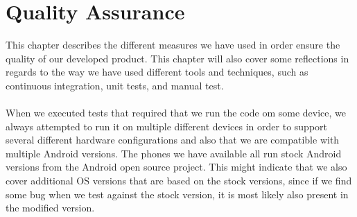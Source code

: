 
\chapter{Quality Assurance}
\label{cha:quality_assurance}

This chapter describes the different measures we have used in order ensure the quality of our developed product. This chapter will also cover some reflections in regards to the way we have used different tools and techniques, such as continuous integration, unit tests, and manual test. 
\\\\
When we executed tests that required that we run the code om some device, we always attempted to run it on multiple different devices in order to support several different hardware configurations and also that we are compatible with multiple Android versions. The phones we have available all run stock Android versions from the Android open source project. This might indicate that we also cover additional OS versions that are based on the stock versions, since if we find some bug when we test against the stock version, it is most likely also present in the modified version. 












